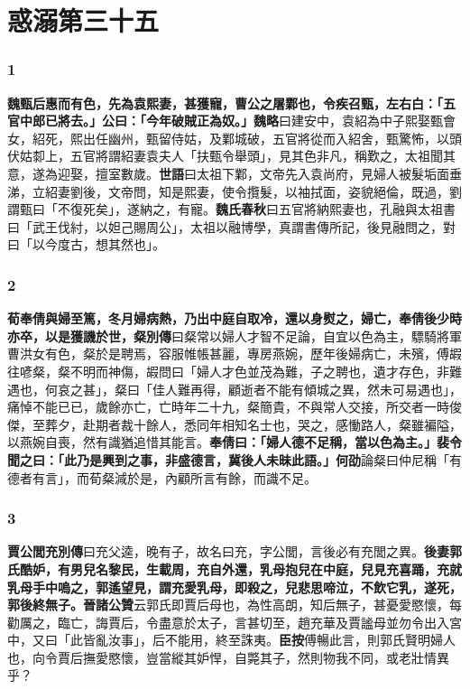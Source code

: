 \chapter{惑溺第三十五}

\subsection*{1}

\textbf{魏甄后惠而有色，先為袁熙妻，甚獲寵，曹公之屠鄴也，令疾召甄，左右白：「五官中郎已將去。」公曰：「今年破賊正為奴。」}{\footnotesize \textbf{魏略}曰建安中，袁紹為中子熙娶甄會女，紹死，熙出任幽州，甄留侍姑，及鄴城破，五官將從而入紹舍，甄驚怖，以頭伏姑厀上，五官將謂紹妻袁夫人「扶甄令舉頭」，見其色非凡，稱歎之，太祖聞其意，遂為迎娶，擅室數歲。\textbf{世語}曰太祖下鄴，文帝先入袁尚府，見婦人被髮垢面垂涕，立紹妻劉後，文帝問，知是熙妻，使令攬髮，以袖拭面，姿貌絕倫，既過，劉謂甄曰「不復死矣」，遂納之，有寵。\textbf{魏氏春秋}曰五官將納熙妻也，孔融與太祖書曰「武王伐紂，以妲己賜周公」，太祖以融博學，真謂書傳所記，後見融問之，對曰「以今度古，想其然也」。}

\subsection*{2}

\textbf{荀奉倩與婦至篤，冬月婦病熱，乃出中庭自取冷，還以身熨之，婦亡，奉倩後少時亦卒，以是獲譏於世，}{\footnotesize \textbf{粲別傳}曰粲常以婦人才智不足論，自宜以色為主，驃騎將軍曹洪女有色，粲於是聘焉，容服帷帳甚麗，專房燕婉，歷年後婦病亡，未殯，傅嘏往喭粲，粲不明而神傷，嘏問曰「婦人才色並茂為難，子之聘也，遺才存色，非難遇也，何哀之甚」，粲曰「佳人難再得，顧逝者不能有傾城之異，然未可易遇也」，痛悼不能已已，歲餘亦亡，亡時年二十九，粲簡貴，不與常人交接，所交者一時俊傑，至葬夕，赴期者裁十餘人，悉同年相知名士也，哭之，感慟路人，粲雖褊隘，以燕婉自喪，然有識猶追惜其能言。}\textbf{奉倩曰：「婦人德不足稱，當以色為主。」裴令聞之曰：「此乃是興到之事，非盛德言，冀後人未昧此語。」}{\footnotesize \textbf{何劭}論粲曰仲尼稱「有德者有言」，而荀粲減於是，內顧所言有餘，而識不足。}

\subsection*{3}

\textbf{賈公閭}{\footnotesize \textbf{充別傳}曰充父逵，晚有子，故名曰充，字公閭，言後必有充閭之異。}\textbf{後妻郭氏酷妒，有男兒名黎民，生載周，充自外還，乳母抱兒在中庭，兒見充喜踊，充就乳母手中嗚之，郭遙望見，謂充愛乳母，即殺之，兒悲思啼泣，不飲它乳，遂死，郭後終無子。}{\footnotesize \textbf{晉諸公贊}云郭氏即賈后母也，為性高朗，知后無子，甚憂愛愍懷，每勸厲之，臨亡，誨賈后，令盡意於太子，言甚切至，趙充華及賈謐母並勿令出入宮中，又曰「此皆亂汝事」，后不能用，終至誅夷。\textbf{臣按}傅暢此言，則郭氏賢明婦人也，向令賈后撫愛愍懷，豈當縱其妒悍，自斃其子，然則物我不同，或老壯情異乎？}

